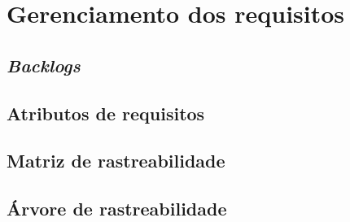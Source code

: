 \chapter{Gerenciamento dos requisitos}

  \section{\textit{Backlogs}}
  
  \section{Atributos de requisitos}
  
  \section{Matriz de rastreabilidade}
  
  \section{Árvore de rastreabilidade}